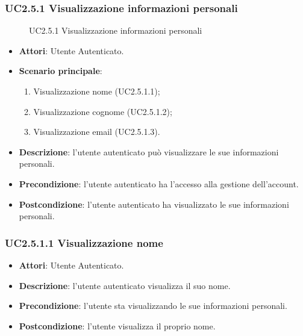 \subsubsection{UC2.5.1 Visualizzazione informazioni personali}
\begin{figure}[H]
\centering
\noindent{}
\caption{UC2.5.1 Visualizzazione informazioni personali}
\end{figure}
\begin{itemize}
\item \textbf{Attori}: Utente Autenticato.
\item \textbf{Scenario principale}:
\begin{enumerate}
\item Visualizzazione nome (UC2.5.1.1);
\item Visualizzazione cognome (UC2.5.1.2);
\item Visualizzazione email (UC2.5.1.3).
\end{enumerate}
\item \textbf{Descrizione}: l'utente autenticato può visualizzare le sue informazioni personali.
\item \textbf{Precondizione}: l'utente autenticato ha l'accesso alla gestione dell'account.
\item \textbf{Postcondizione}: l'utente autenticato ha visualizzato le sue informazioni personali.
\end{itemize}
\subsubsection{UC2.5.1.1 Visualizzazione nome}
\begin{itemize}
\item \textbf{Attori}: Utente Autenticato.
\item \textbf{Descrizione}: l'utente autenticato visualizza il suo nome.
\item \textbf{Precondizione}: l'utente sta visualizzando le sue informazioni personali.
\item \textbf{Postcondizione}: l'utente visualizza il proprio nome.
\end{itemize}
